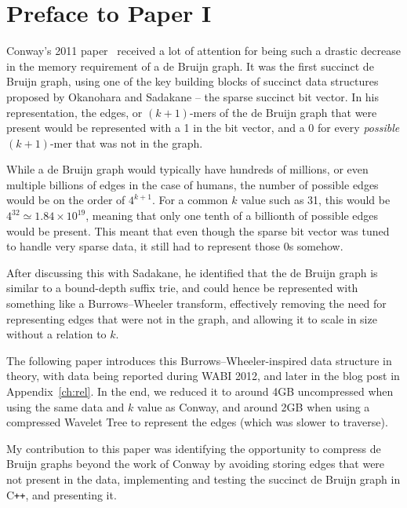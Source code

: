 \chapter*{Preface to Paper I}

Conway's 2011 paper~\cite{conway} received a lot of attention for being such a drastic decrease in the memory requirement of a de Bruijn graph. It was the first succinct de Bruijn graph, using one of the key building blocks of succinct data structures proposed by Okanohara and Sadakane \cite{bitvector} -- the sparse succinct bit vector. In his representation, the edges, or $(k+1)$-mers of the de Bruijn graph that were present would be represented with a 1 in the bit vector, and a 0 for every \emph{possible} $(k+1)$-mer that was not in the graph.

While a de Bruijn graph would typically have hundreds of millions, or even multiple billions of edges in the case of humans, the number of possible edges would be on the order of $4^{k+1}$. For a common $k$ value such as 31, this would be $4^{32} \simeq 1.84 \times 10^{19}$, meaning that only one tenth of a billionth of possible edges would be present. This meant that even though the sparse bit vector was tuned to handle very sparse data, it still had to represent those 0s somehow.

After discussing this with Sadakane, he identified that the de Bruijn graph is similar to a bound-depth suffix trie, and could hence be represented with something like a Burrows--Wheeler transform, effectively removing the need for representing edges that were not in the graph, and allowing it to scale in size without a relation to $k$.

The following paper introduces this Burrows--Wheeler-inspired data structure in theory, with data being reported during WABI 2012, and later in the blog post in Appendix~\ref{ch:rel}. In the end, we reduced it to around 4GB uncompressed when using the same data and $k$ value as Conway, and around 2GB when using a compressed Wavelet Tree to represent the edges (which was slower to traverse).

My contribution to this paper was identifying the opportunity to compress de Bruijn graphs beyond the work of Conway by avoiding storing edges that were not present in the data, implementing and testing the succinct de Bruijn graph in C\texttt{++}, and presenting it.

